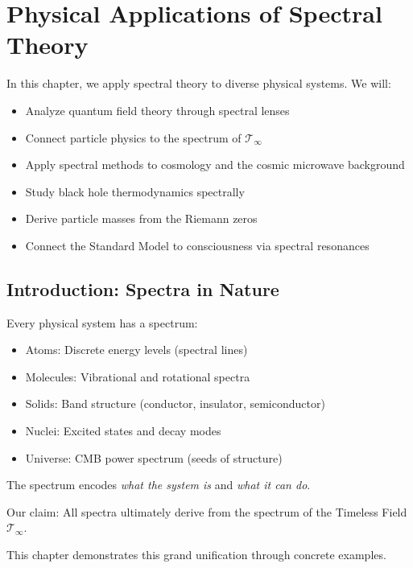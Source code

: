 \chapter{Physical Applications of Spectral Theory}
\label{ch:physical-applications}

\begin{chapterobjectives}
In this chapter, we apply spectral theory to diverse physical systems. We will:
\begin{itemize}
\item Analyze quantum field theory through spectral lenses
\item Connect particle physics to the spectrum of $\mathcal{T}_\infty$
\item Apply spectral methods to cosmology and the cosmic microwave background
\item Study black hole thermodynamics spectrally
\item Derive particle masses from the Riemann zeros
\item Connect the Standard Model to consciousness via spectral resonances
\end{itemize}
\end{chapterobjectives}

\section{Introduction: Spectra in Nature}

\begin{intuitive}
Every physical system has a spectrum:
\begin{itemize}
\item Atoms: Discrete energy levels (spectral lines)
\item Molecules: Vibrational and rotational spectra
\item Solids: Band structure (conductor, insulator, semiconductor)
\item Nuclei: Excited states and decay modes
\item Universe: CMB power spectrum (seeds of structure)
\end{itemize}

The spectrum encodes \textit{what the system is} and \textit{what it can do}.

Our claim: All spectra ultimately derive from the spectrum of the Timeless Field $\mathcal{T}_\infty$.
\end{intuitive}

This chapter demonstrates this grand unification through concrete examples.

